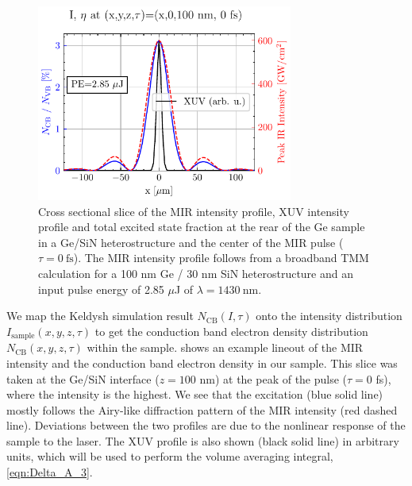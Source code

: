 \begin{figure}
	\centering
	\includegraphics[width=0.75\textwidth]{figures/chap4/excitation_at_focus.pdf}
	\caption{Cross sectional slice of the MIR intensity profile, XUV intensity profile and total excited state fraction at the rear of the Ge sample in a Ge/SiN heterostructure and the center of the MIR pulse ($\tau = 0 \ \textrm{fs}$). The MIR intensity profile follows from a broadband TMM calculation for a 100 nm Ge / 30 nm SiN heterostructure and an input pulse energy of {2.85 $\mu$J} of $\lambda = 1430 \ \textrm{nm}$.}
	\label{fig:excitation_at_focus}
\end{figure}

We map the Keldysh simulation result $N_{\textrm{CB}}(I, \tau)$ onto the intensity distribution $I_{\textrm{sample}}(x, y, z, \tau)$ to get the conduction band electron density distribution $N_{\textrm{CB}}(x, y, z, \tau)$ within the sample.  shows an example lineout of the MIR intensity and the conduction band electron density in our sample. This slice was taken at the Ge/SiN interface ($z=100$ nm) at the peak of the pulse ($\tau=0$ fs), where the intensity is the highest. We see that the excitation (blue solid line) mostly follows the Airy-like diffraction pattern of the MIR intensity (red dashed line). Deviations between the two profiles are due to the nonlinear response of the sample to the laser. The XUV profile is also shown (black solid line) in arbitrary units, which will be used to perform the volume averaging integral, \cref{eqn:Delta_A_3}.

